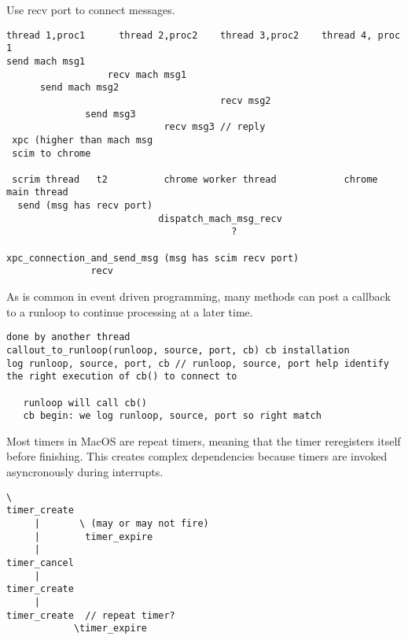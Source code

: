 Use recv port to connect messages.

\begin{verbatim}
thread 1,proc1      thread 2,proc2    thread 3,proc2    thread 4, proc 1
send mach msg1
                  recv mach msg1
      send mach msg2
                                      recv msg2
              send msg3
                            recv msg3 // reply
 xpc (higher than mach msg
 scim to chrome

 scrim thread   t2          chrome worker thread            chrome main thread
  send (msg has recv port)
                           dispatch_mach_msg_recv
                                        ?

xpc_connection_and_send_msg (msg has scim recv port)
               recv
\end{verbatim}

As is common in event driven programming, many methods can post a callback to a runloop to continue processing at a later time.

\begin{verbatim}
done by another thread
callout_to_runloop(runloop, source, port, cb) cb installation
log runloop, source, port, cb // runloop, source, port help identify
the right execution of cb() to connect to

   runloop will call cb()
   cb begin: we log runloop, source, port so right match
\end{verbatim}


Most timers in MacOS are repeat timers, meaning that the timer reregisters itself before finishing.
This creates complex dependencies because timers are invoked asyncronously during interrupts.


\begin{verbatim}
\
timer_create
     |       \ (may or may not fire)
     |        timer_expire
     |
timer_cancel
     |
timer_create
     |
timer_create  // repeat timer?
            \timer_expire

\end{verbatim}
